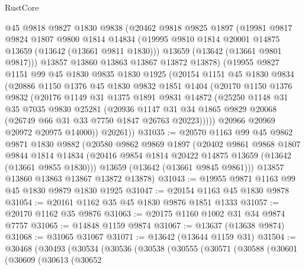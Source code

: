 \begin{lexlean}{RustCore}
\begin{coremodule}
      @45
      @9818
      @9827
      @1830
      @9838
      (@20462
        @9818
        @9825
        @1897
        (@19981
          @9817
          @9824
          @1807
          @9800
          @1814
          @14834
          (@19995 @9810 @1814 @20001 @14875 @13659 (@13642 (@13661 @9811 @1830)))
          @13659
          (@13642 (@13661 @9801 @9817)))
        @13857
        @13860
        @13863
        @13867
        @13872
        @13878)
      (@19955
        @9827
        @1151
        @99
        @45
        @1830
        @9835
        @1830
        @1925
        (@20154
          @1151
          @45
          @1830
          @9834
          (@20886
            @1150
            @1376
            @45
            @1830
            @9832
            @1851
            @1404
            (@20170
              @1150
              @1376
              @9832
              (@20176
                @1149
                @31
                @1375
                @1891
                @9831
                @14872
                (@25250
                  @1148
                  @31
                  @35
                  @7035
                  @9830
                  @25281
                  (@20936
                    @1147
                    @31
                    @34
                    @1865
                    @9829
                    @20068
                    (@26749 @66 @31 @33 @7750 @1847 @26763 @20223)))))
            @20966
            @20969
            @20972
            @20975
            @14000))
        @20261))
@31035 := @20570
    @1163
    @99
    @45
    @9862
    @9871
    @1830
    @9882
    (@20580
      @9862
      @9869
      @1897
      (@20402
        @9861
        @9868
        @1807
        @9844
        @1814
        @14834
        (@20416 @9854 @1814 @20422 @14875 @13659 (@13642 (@13661 @9855 @1830)))
        @13659
        (@13642 (@13661 @9845 @9861)))
      @13857
      @13860
      @13863
      @13867
      @13872
      @13878)
@31043 := @19955 @9871 @1163 @99 @45 @1830 @9879 @1830 @1925
@31047 := @20154 @1163 @45 @1830 @9878
@31054 := @20161 @1162 @35 @45 @1830 @9876 @1851 @1333
@31057 := @20170 @1162 @35 @9876
@31063 := @20175 @1160 @1002 @31 @34 @9874 @7757
@31065 := @14848 @1159 @9874
@31067 := @13637 (@13638 @9874)
@31068 := @31065 @31067
@31071 := @13642 (@13644 @1159 @31)
@31504 := @30468
    (@30493
      (@30534
        (@30536
          (@30538
            (@30555
              (@30571
                (@30588
                  (@30601
                    (@30609
                      (@30613
                        (@30652

\end{coremodule}
\end{lexlean}
